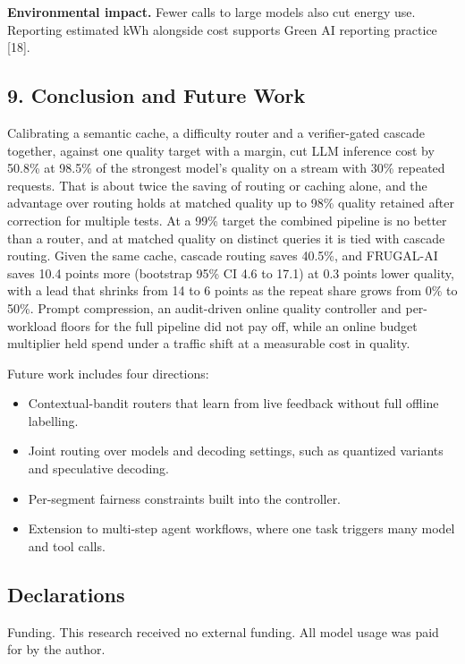 \documentclass[
  10pt,
]{article}
\providecommand{\tightlist}{%
  \setlength{\itemsep}{0pt}\setlength{\parskip}{0pt}}
\begin{document}
\textbf{Environmental impact.} Fewer calls to large models also cut
energy use. Reporting estimated kWh alongside cost supports Green AI
reporting practice {[}18{]}.

\subsection{9. Conclusion and Future
Work}\label{conclusion-and-future-work}

Calibrating a semantic cache, a difficulty router and a verifier-gated
cascade together, against one quality target with a margin, cut LLM
inference cost by 50.8\% at 98.5\% of the strongest model's quality on a
stream with 30\% repeated requests. That is about twice the saving of
routing or caching alone, and the advantage over routing holds at
matched quality up to 98\% quality retained after correction for
multiple tests. At a 99\% target the combined pipeline is no better than
a router, and at matched quality on distinct queries it is tied with
cascade routing. Given the same cache, cascade routing saves 40.5\%, and
FRUGAL-AI saves 10.4 points more (bootstrap 95\% CI 4.6 to 17.1) at 0.3
points lower quality, with a lead that shrinks from 14 to 6 points as
the repeat share grows from 0\% to 50\%. Prompt compression, an
audit-driven online quality controller and per-workload floors for the
full pipeline did not pay off, while an online budget multiplier held
spend under a traffic shift at a measurable cost in quality.

Future work includes four directions:

\begin{itemize}
\tightlist
\item
  Contextual-bandit routers that learn from live feedback without full
  offline labelling.
\item
  Joint routing over models and decoding settings, such as quantized
  variants and speculative decoding.
\item
  Per-segment fairness constraints built into the controller.
\item
  Extension to multi-step agent workflows, where one task triggers many
  model and tool calls.
\end{itemize}

\subsection{Declarations}\label{declarations}

Funding. This research received no external funding. All model usage was
paid for by the author.
\end{document}
